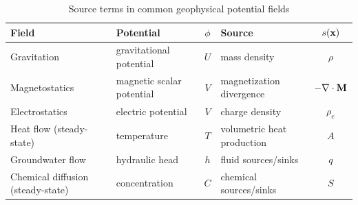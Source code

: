 \begin{table}[tbh]
    \centering
    \caption{Source terms in common geophysical potential fields}
    \label{tab:potential_sources}
    \begin{tabularx}{\textwidth}{lXcXc}
        \toprule
        \textbf{Field} 
        & \textbf{Potential} 
        & $\phi$
        & \textbf{Source} 
        & $s(\vb{x})$ \\
        \midrule
        Gravitation
        & gravitational potential
        & $U$
        & mass density
        & $\rho$ \\

        Magnetostatics
        & magnetic scalar potential
        & $V$
        & magnetization divergence
        & $-\nabla \cdot \vb{M}$ \\

        Electrostatics
        & electric potential
        & $V$
        & charge density
        & $\rho_e$ \\

        Heat flow (steady-state)
        & temperature
        & $T$
        & volumetric heat production
        & $A$ \\

        Groundwater flow
        & hydraulic head
        & $h$
        & fluid sources/sinks
        & $q$ \\

        Chemical diffusion (steady-state)
        & concentration
        & $C$
        & chemical sources/sinks
        & $S$ \\
        \bottomrule
    \end{tabularx}
\end{table}